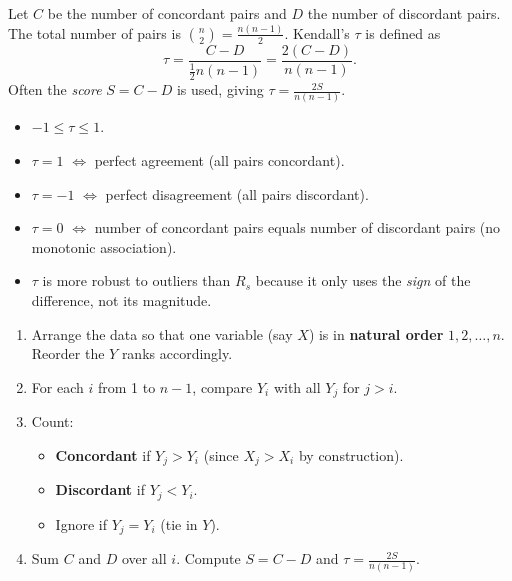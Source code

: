\documentclass[11pt]{article}
\begin{document}
Let \(C\) be the number of concordant pairs and \(D\) the number of discordant pairs. The total number of pairs is \(\binom{n}{2} = \frac{n(n-1)}{2}\). Kendall's \(\tau\) is defined as
\[
\boxed{\tau = \frac{C - D}{\frac{1}{2}n(n-1)} = \frac{2(C-D)}{n(n-1)}.}
\]
Often the \emph{score} \(S = C - D\) is used, giving \(\tau = \frac{2S}{n(n-1)}\).

\begin{propriete}
\begin{itemize}
\item \(-1 \le \tau \le 1\).
\item \(\tau = 1\) \(\iff\) perfect agreement (all pairs concordant).
\item \(\tau = -1\) \(\iff\) perfect disagreement (all pairs discordant).
\item \(\tau = 0\) \(\iff\) number of concordant pairs equals number of discordant pairs (no monotonic association).
\item \(\tau\) is more robust to outliers than \(R_s\) because it only uses the \emph{sign} of the difference, not its magnitude.
\end{itemize}
\end{propriete}

\begin{methode}
\begin{enumerate}
\item Arrange the data so that one variable (say \(X\)) is in \textbf{natural order} \(1,2,\dots,n\). Reorder the \(Y\) ranks accordingly.
\item For each \(i\) from 1 to \(n-1\), compare \(Y_i\) with all \(Y_j\) for \(j>i\).
\item Count:
\begin{itemize}
\item \textbf{Concordant} if \(Y_j > Y_i\) (since \(X_j > X_i\) by construction).
\item \textbf{Discordant} if \(Y_j < Y_i\).
\item Ignore if \(Y_j = Y_i\) (tie in \(Y\)).
\end{itemize}
\item Sum \(C\) and \(D\) over all \(i\). Compute \(S = C - D\) and \(\tau = \frac{2S}{n(n-1)}\).
\end{enumerate}
\end{methode}
\end{document}
